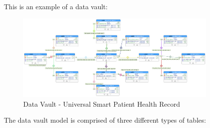 \\ \\
\noindent
This is an example of a data vault:

\begin{figure}[H]
    \centering
    \includegraphics[width=10cm]{figures/technical/universal_smart_patient_record.png}
    \caption{Data Vault - Universal Smart Patient Health Record}
    \label{fig:dvlinks}
\end{figure}

The data vault model is comprised of three different types of tables:


